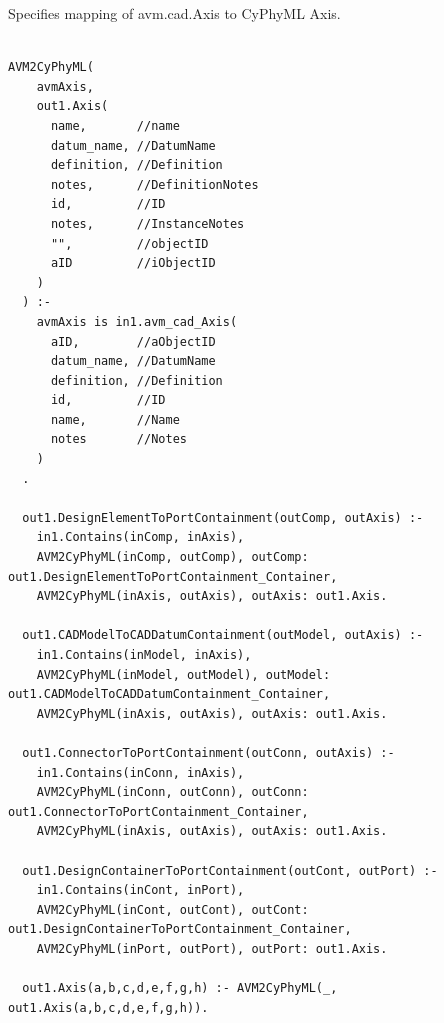 Specifies mapping of avm.cad.Axis to CyPhyML Axis.
\begin{lstlisting}

AVM2CyPhyML(
    avmAxis,
    out1.Axis(
      name,       //name
      datum_name, //DatumName
      definition, //Definition
      notes,      //DefinitionNotes
      id,         //ID
      notes,      //InstanceNotes
      "",         //objectID
      aID         //iObjectID
    )
  ) :-
    avmAxis is in1.avm_cad_Axis(
      aID,        //aObjectID
      datum_name, //DatumName
      definition, //Definition
      id,         //ID
      name,       //Name
      notes       //Notes
    )
  .

  out1.DesignElementToPortContainment(outComp, outAxis) :-
    in1.Contains(inComp, inAxis),
    AVM2CyPhyML(inComp, outComp), outComp: out1.DesignElementToPortContainment_Container,
    AVM2CyPhyML(inAxis, outAxis), outAxis: out1.Axis.

  out1.CADModelToCADDatumContainment(outModel, outAxis) :-
    in1.Contains(inModel, inAxis),
    AVM2CyPhyML(inModel, outModel), outModel: out1.CADModelToCADDatumContainment_Container,
    AVM2CyPhyML(inAxis, outAxis), outAxis: out1.Axis.

  out1.ConnectorToPortContainment(outConn, outAxis) :-
    in1.Contains(inConn, inAxis),
    AVM2CyPhyML(inConn, outConn), outConn: out1.ConnectorToPortContainment_Container,
    AVM2CyPhyML(inAxis, outAxis), outAxis: out1.Axis.

  out1.DesignContainerToPortContainment(outCont, outPort) :-
    in1.Contains(inCont, inPort),
    AVM2CyPhyML(inCont, outCont), outCont: out1.DesignContainerToPortContainment_Container,
    AVM2CyPhyML(inPort, outPort), outPort: out1.Axis.

  out1.Axis(a,b,c,d,e,f,g,h) :- AVM2CyPhyML(_, out1.Axis(a,b,c,d,e,f,g,h)).


\end{lstlisting}

